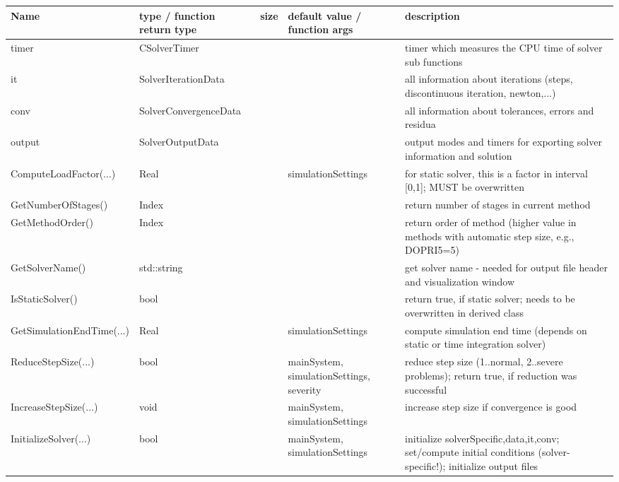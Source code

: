 \begin{center}
  \footnotesize
  \begin{longtable}{| p{4.2cm} | p{2.5cm} | p{0.3cm} | p{3.0cm} | p{6cm} |}
    \hline
    \bf Name & \bf type / function return type & \bf size & \bf default value / function args & \bf description \\ \hline
    timer &     CSolverTimer &      &      &     timer which measures the CPU time of solver sub functions\\ \hline
    it &     SolverIterationData &      &      &     all information about iterations (steps, discontinuous iteration, newton,...)\\ \hline
    conv &     SolverConvergenceData &      &      &     all information about tolerances, errors and residua\\ \hline
    output &     SolverOutputData &      &      &     output modes and timers for exporting solver information and solution\\ \hline
    ComputeLoadFactor(...) &     Real &      &     simulationSettings &     for static solver, this is a factor in interval [0,1]; MUST be overwritten\\ \hline
    GetNumberOfStages() &     Index &      &      &     return number of stages in current method\\ \hline
    GetMethodOrder() &     Index &      &      &     return order of method (higher value in methods with automatic step size, e.g., DOPRI5=5)\\ \hline
    GetSolverName() &     std::string &      &      &     get solver name - needed for output file header and visualization window\\ \hline
    IsStaticSolver() &     bool &      &      &     return true, if static solver; needs to be overwritten in derived class\\ \hline
    GetSimulationEndTime(...) &     Real &      &     simulationSettings &     compute simulation end time (depends on static or time integration solver)\\ \hline
    ReduceStepSize(...) &     bool &      &     mainSystem, simulationSettings, severity &     reduce step size (1..normal, 2..severe problems); return true, if reduction was successful\\ \hline
    IncreaseStepSize(...) &     void &      &     mainSystem, simulationSettings &     increase step size if convergence is good\\ \hline
    InitializeSolver(...) &     bool &      &     mainSystem, simulationSettings &     initialize solverSpecific,data,it,conv; set/compute initial conditions (solver-specific!); initialize output files\\ \hline

\end{longtable}
\end{center}
